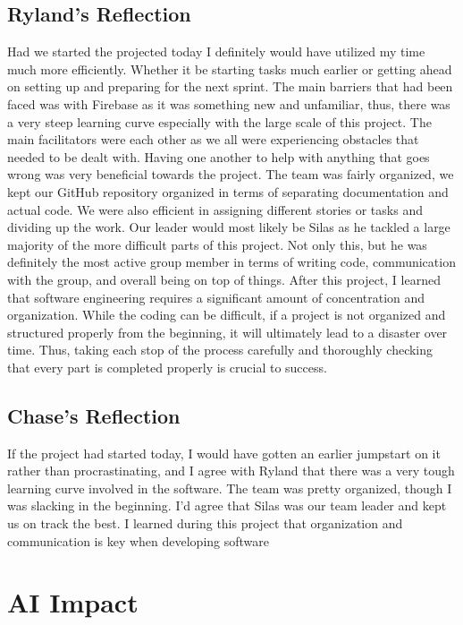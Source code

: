 \subsection{Ryland's Reflection}
Had we started the projected today I definitely would have utilized my time much more efficiently. Whether it be starting tasks much earlier or getting ahead on setting up and preparing for the next sprint. The main barriers that had been faced was with Firebase as it was something new and unfamiliar, thus, there was a very steep learning curve especially with the large scale of this project. The main facilitators were each other as we all were experiencing obstacles that needed to be dealt with. Having one another to help with anything that goes wrong was very beneficial towards the project. The team was fairly organized, we kept our GitHub repository organized in terms of separating documentation and actual code. We were also efficient in assigning different stories or tasks and dividing up the work. Our leader would most likely be Silas as he tackled a large majority of the more difficult parts of this project. Not only this, but he was definitely the most active group member in terms of writing code, communication with the group, and overall being on top of things. After this project, I learned that software engineering requires a significant amount of concentration and organization. While the coding can be difficult, if a project is not organized and structured properly from the beginning, it will ultimately lead to a disaster over time. Thus, taking each stop of the process carefully and thoroughly checking that every part is completed properly is crucial to success.

\subsection{Chase's Reflection}
If the project had started today, I would have gotten an earlier jumpstart on it rather than procrastinating, and I agree with Ryland that there was a very tough learning curve involved in the software. The team was pretty organized, though I was slacking in the beginning. I’d agree that Silas was our team leader and kept us on track the best. I learned during this project that organization and communication is key when developing software

\newpage
\section{AI Impact}

